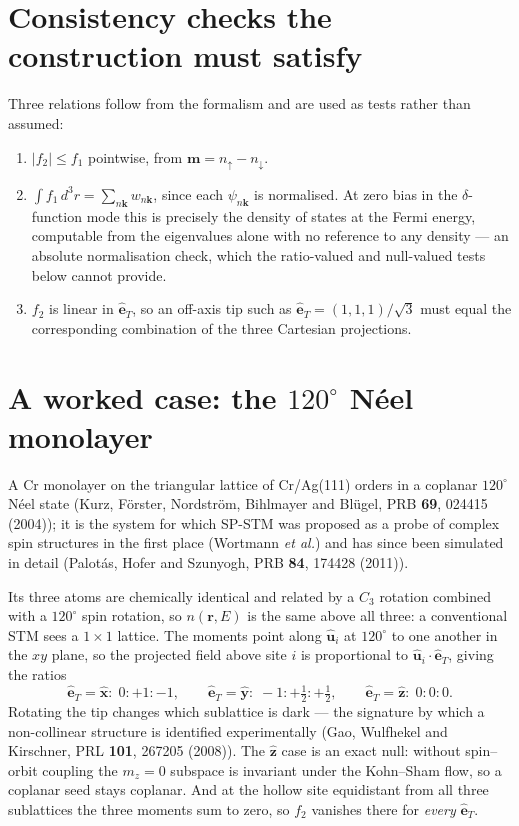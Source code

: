 \documentclass[11pt]{article}
\begin{document}
\section{Consistency checks the construction must satisfy}

Three relations follow from the formalism and are used as tests rather than
assumed:
\begin{enumerate}
\item $|f_2|\le f_1$ pointwise, from $\mathbf m=n_\uparrow-n_\downarrow$.
\item $\int f_1\,d^3r = \sum_{n\mathbf k}w_{n\mathbf k}$, since each
  $\psi_{n\mathbf k}$ is normalised. At zero bias in the $\delta$-function mode
  this is precisely the density of states at the Fermi energy, computable from
  the eigenvalues alone with no reference to any density --- an absolute
  normalisation check, which the ratio-valued and null-valued tests below
  cannot provide.
\item $f_2$ is linear in $\hat{\mathbf e}_T$, so an off-axis tip such as
  $\hat{\mathbf e}_T=(1,1,1)/\sqrt3$ must equal the corresponding combination
  of the three Cartesian projections.
\end{enumerate}

\section{A worked case: the $120^\circ$ N\'eel monolayer}

A Cr monolayer on the triangular lattice of Cr/Ag(111) orders in a coplanar
$120^\circ$ N\'eel state (Kurz, F\"orster, Nordstr\"om, Bihlmayer and
Bl\"ugel, PRB \textbf{69}, 024415 (2004)); it is the system for which SP-STM
was proposed as a probe of complex spin structures in the first place
(Wortmann \emph{et al.}) and has since been simulated in detail (Palot\'as,
Hofer and Szunyogh, PRB \textbf{84}, 174428 (2011)).

Its three atoms are chemically identical and related by a $C_3$ rotation
combined with a $120^\circ$ spin rotation, so $n(\mathbf r,E)$ is the same
above all three: a conventional STM sees a $1\times1$ lattice. The moments
point along $\hat{\mathbf u}_i$ at $120^\circ$ to one another in the $xy$
plane, so the projected field above site $i$ is proportional to
$\hat{\mathbf u}_i\cdot\hat{\mathbf e}_T$, giving the ratios
\begin{equation}
  \hat{\mathbf e}_T=\hat{\mathbf x}:\;0:+1:-1,
  \qquad
  \hat{\mathbf e}_T=\hat{\mathbf y}:\;-1:+\tfrac12:+\tfrac12,
  \qquad
  \hat{\mathbf e}_T=\hat{\mathbf z}:\;0:0:0 .
  \label{eq:neel-ratios}
\end{equation}
Rotating the tip changes which sublattice is dark --- the signature by which
a non-collinear structure is identified experimentally (Gao, Wulfhekel and
Kirschner, PRL \textbf{101}, 267205 (2008)). The $\hat{\mathbf z}$ case is an
exact null: without spin--orbit coupling the $m_z=0$ subspace is invariant
under the Kohn--Sham flow, so a coplanar seed stays coplanar. And at the
hollow site equidistant from all three sublattices the three moments sum to
zero, so $f_2$ vanishes there for \emph{every} $\hat{\mathbf e}_T$.
\end{document}
